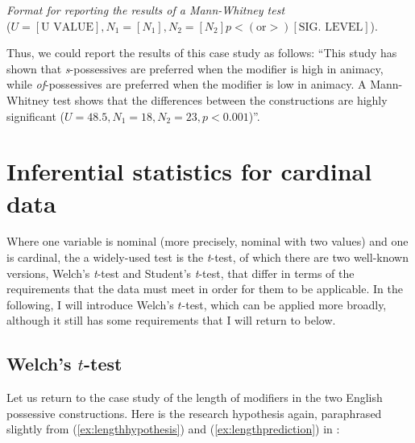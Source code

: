 \begin{exe}
\ex \textit{Format for reporting the results of a Mann\hyp{}Whitney test} \\
($U = [\text{U VALUE}], N_1 = [N_1], N_2 = [N_2] p < (\text{or} >) [\text{SIG. LEVEL}]$).
\label{ex:reportingmannwhitney}
\end{exe}

Thus, we could report the results of this case study as follows: ``This study has shown that \textit{s}-possessives are preferred when the modifier is high in animacy,  while \textit{of}-possessives  are preferred when the modifier is low in animacy. A Mann\hyp{}Whitney  test shows that the differences between the constructions are highly significant  ($U = 48.5, N_1 = 18, N_2 = 23, p < 0.001$)''.

\section{Inferential statistics for cardinal data}
\label{sec:statisticscardinal}

Where one variable is nominal  (more precisely, nominal with two values) and one is cardinal,  the a widely\hyp{}used test is the \textit{t}-test,  of which there are two well\hyp{}known versions, Welch's \textit{t}-test and Student's \textit{t}-test, that differ in terms of the requirements that the data must meet in order for them to be applicable. In the following, I will introduce Welch's $t$\hyp{}test, which can be applied more broadly, although it still has some requirements that I will return to below.

\subsection{Welch's $t$\hyp{}test}
\label{sec:welchsttest}


Let us return to the case study of the length  of modifiers in the two English possessive constructions. Here is the research hypothesis again, paraphrased slightly from (\ref{ex:lengthhypothesis}) and (\ref{ex:lengthprediction}) in :

